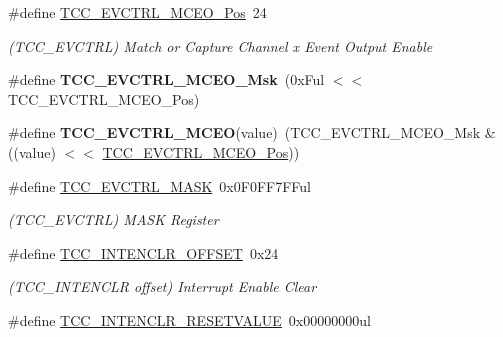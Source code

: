 \begin{DoxyCompactItemize}
\item 
\hypertarget{group___s_a_m_l21___t_c_c_ga183a826fe7ed3deda2cac35d635fcb86}{}\#define \hyperlink{group___s_a_m_l21___t_c_c_ga183a826fe7ed3deda2cac35d635fcb86}{T\+C\+C\+\_\+\+E\+V\+C\+T\+R\+L\+\_\+\+M\+C\+E\+O\+\_\+\+Pos}~24\label{group___s_a_m_l21___t_c_c_ga183a826fe7ed3deda2cac35d635fcb86}

\begin{DoxyCompactList}\small\item\em (T\+C\+C\+\_\+\+E\+V\+C\+T\+R\+L) Match or Capture Channel x Event Output Enable \end{DoxyCompactList}\item 
\hypertarget{group___s_a_m_l21___t_c_c_gaa7e18e05d64e3a7a2a9c902cf65ee99f}{}\#define {\bfseries T\+C\+C\+\_\+\+E\+V\+C\+T\+R\+L\+\_\+\+M\+C\+E\+O\+\_\+\+Msk}~(0x\+Ful $<$$<$ T\+C\+C\+\_\+\+E\+V\+C\+T\+R\+L\+\_\+\+M\+C\+E\+O\+\_\+\+Pos)\label{group___s_a_m_l21___t_c_c_gaa7e18e05d64e3a7a2a9c902cf65ee99f}

\item 
\hypertarget{group___s_a_m_l21___t_c_c_gaf96b2c786c8a31e225eda2c2eefe145f}{}\#define {\bfseries T\+C\+C\+\_\+\+E\+V\+C\+T\+R\+L\+\_\+\+M\+C\+E\+O}(value)~(T\+C\+C\+\_\+\+E\+V\+C\+T\+R\+L\+\_\+\+M\+C\+E\+O\+\_\+\+Msk \& ((value) $<$$<$ \hyperlink{group___s_a_m_l21___t_c_c_ga183a826fe7ed3deda2cac35d635fcb86}{T\+C\+C\+\_\+\+E\+V\+C\+T\+R\+L\+\_\+\+M\+C\+E\+O\+\_\+\+Pos}))\label{group___s_a_m_l21___t_c_c_gaf96b2c786c8a31e225eda2c2eefe145f}

\item 
\hypertarget{group___s_a_m_l21___t_c_c_ga93de5e50f634a349515fc1015f82d994}{}\#define \hyperlink{group___s_a_m_l21___t_c_c_ga93de5e50f634a349515fc1015f82d994}{T\+C\+C\+\_\+\+E\+V\+C\+T\+R\+L\+\_\+\+M\+A\+S\+K}~0x0\+F0\+F\+F7\+F\+Ful\label{group___s_a_m_l21___t_c_c_ga93de5e50f634a349515fc1015f82d994}

\begin{DoxyCompactList}\small\item\em (T\+C\+C\+\_\+\+E\+V\+C\+T\+R\+L) M\+A\+S\+K Register \end{DoxyCompactList}\item 
\hypertarget{group___s_a_m_l21___t_c_c_ga1cbbd7df339ca6d25d2d3ec58ff44315}{}\#define \hyperlink{group___s_a_m_l21___t_c_c_ga1cbbd7df339ca6d25d2d3ec58ff44315}{T\+C\+C\+\_\+\+I\+N\+T\+E\+N\+C\+L\+R\+\_\+\+O\+F\+F\+S\+E\+T}~0x24\label{group___s_a_m_l21___t_c_c_ga1cbbd7df339ca6d25d2d3ec58ff44315}

\begin{DoxyCompactList}\small\item\em (T\+C\+C\+\_\+\+I\+N\+T\+E\+N\+C\+L\+R offset) Interrupt Enable Clear \end{DoxyCompactList}\item 
\hypertarget{group___s_a_m_l21___t_c_c_ga7def36255aad3da171799503a7f686d2}{}\#define \hyperlink{group___s_a_m_l21___t_c_c_ga7def36255aad3da171799503a7f686d2}{T\+C\+C\+\_\+\+I\+N\+T\+E\+N\+C\+L\+R\+\_\+\+R\+E\+S\+E\+T\+V\+A\+L\+U\+E}~0x00000000ul\label{group___s_a_m_l21___t_c_c_ga7def36255aad3da171799503a7f686d2}


\end{DoxyCompactItemize}
